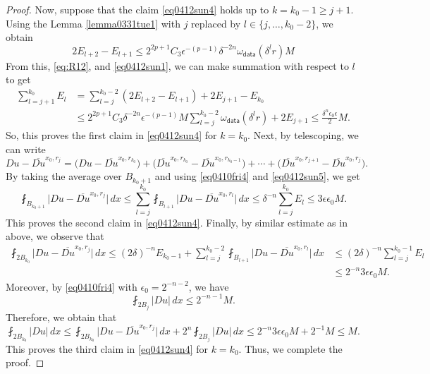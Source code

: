 \documentclass[reqno]{amsart}
\numberwithin{equation}{section}
\theoremstyle{plain}
\theoremstyle{definition}
\theoremstyle{remark}
\providecommand{\abs}[1]{\lvert#1\rvert}
\begin{document}
\begin{proof}
Now, suppose that the claim \eqref{eq0412sun4} holds up to $k=k_0-1\ge j+1$. Using the Lemma \ref{lemma0331tue1} with $j$ replaced by $l\in\{j,\dots, k_0-2\}$, we obtain
\begin{equation*}%
2E_{l+2}-E_{l+1}\leq 2^{2p+1}C_3\epsilon^{-(p-1)}\delta^{-2n} \omega_\mathsf{data}(\delta^l r)M
\end{equation*}
From this, \eqref{eq:R12}, and \eqref{eq0412sun1}, we can make summation with respect to $l$ to get
\begin{equation}\label{eq0412sun5}\begin{aligned} 
\sum^{k_0}_{l=j+1} E_l & =\sum^{k_0-2}_{l=j} (2E_{l+2}-E_{l+1}) +2E_{j+1}-E_{k_0}\\
&\leq 2^{2p+1}C_3\delta^{-2n} \epsilon^{-(p-1)} M  \sum^{k_0-2}_{l=j} \omega_{\mathsf{data}}(\delta^l r)+2 E_{j+1}\leq \frac{\delta^n \epsilon_0 \epsilon}{2}M.
\end{aligned}\end{equation}
So, this proves the first claim in \eqref{eq0412sun4} for $k=k_0$.
Next, by telescoping, we can write
\[
Du -\overline{Du}^{x_0,r_j}=\big( Du -\overline{Du}^{x_0,r_{k_0}}\big) +\big(  \overline{Du}^{x_0,r_{k_0}}-\overline{Du}^{x_0,r_{k_0-1}} \big)+\cdots + \big(  \overline{Du}^{x_0,r_{j+1}}-\overline{Du}^{x_0,r_{j}} \big).
\]
By taking the average over $B_{k_0+1}$ and using \eqref{eq0410fri4} and \eqref{eq0412sun5}, we get
\[
\fint_{B_{k_0+1}} \abs{Du -\overline{Du}^{x_0,r_j}} \, dx\leq \sum^{k_0}_{l=j}\fint_{B_{l+1}} \abs{Du -\overline{Du}^{x_0,r_l}} \, dx\leq \delta^{-n}\sum^{k_0}_{l=j} E_l\leq 3\epsilon\epsilon_0  M.
\]
This proves the second claim in \eqref{eq0412sun4}.
Finally, by similar estimate as in above, we observe that
\begin{align*}
\fint_{2B_{k_0}} \abs{Du -\overline{Du}^{x_0,r_j}}  \, dx
\leq (2\delta)^{-n}E_{k_0-1}+ \sum^{k_0-2}_{l=j}\fint_{B_{l+1}} \abs{Du -\overline{Du}^{x_0,r_l}}\, dx
& \leq(2\delta)^{-n}\sum^{k_0-1}_{l=j} E_l\\
&\leq 2^{-n}3\epsilon\epsilon_0  M.
\end{align*}
Moreover, by \eqref{eq0410fri4} with $\epsilon_0=2^{-n-2}$, we have
\[
\fint_{2B_j} \abs{Du}\,dx\leq 2^{-n-1} M.
\]
Therefore, we obtain that
\[
\fint_{2B_{k_0}}\abs{Du} \,dx\leq \fint_{2B_{k_0}}\abs{Du  -\overline{Du}^{x_0,r_j}}\, dx+2^n \fint_{2B_j}\abs{Du} \,dx\leq   2^{-n}3\epsilon\epsilon_0  M+  2^{-1} M\leq M.
\]
This proves the third claim in \eqref{eq0412sun4} for $k=k_0$. Thus, we complete the proof.
\end{proof}
\end{document}
